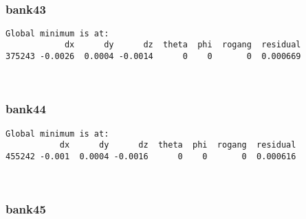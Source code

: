\documentclass[11pt]{article}
\begin{document}
    \begin{center}
    \end{center}
    { \hspace*{\fill} \\}
    
    \hypertarget{bank43}{%
\subsubsection{bank43}\label{bank43}}

    \begin{Verbatim}[commandchars=\\\{\}]
Global minimum is at:
            dx      dy      dz  theta  phi  rogang  residual
375243 -0.0026  0.0004 -0.0014      0    0       0  0.000669
    \end{Verbatim}

    \begin{center}
    \end{center}
    { \hspace*{\fill} \\}
    
    \hypertarget{bank44}{%
\subsubsection{bank44}\label{bank44}}

    \begin{Verbatim}[commandchars=\\\{\}]
Global minimum is at:
           dx      dy      dz  theta  phi  rogang  residual
455242 -0.001  0.0004 -0.0016      0    0       0  0.000616
    \end{Verbatim}

    \begin{center}
    \end{center}
    { \hspace*{\fill} \\}
    
    \hypertarget{bank45}{%
\subsubsection{bank45}\label{bank45}}
\end{document}

